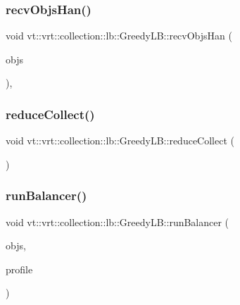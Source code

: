 \subsubsection{\texorpdfstring{recv\+Objs\+Han()}{recvObjsHan()}}
{\footnotesize\ttfamily void vt\+::vrt\+::collection\+::lb\+::\+Greedy\+L\+B\+::recv\+Objs\+Han (\begin{DoxyParamCaption}\item[{\hyperlink{structvt_1_1vrt_1_1collection_1_1lb_1_1_greedy_l_b_types_ae22670acd689e4ff83315fac2e4acb5e}{Greedy\+L\+B\+Types\+::\+Obj\+I\+D\+Type} $\ast$}]{objs }\end{DoxyParamCaption})\hspace{0.3cm}{\ttfamily [static]}, {\ttfamily [private]}}

\mbox{\label{structvt_1_1vrt_1_1collection_1_1lb_1_1_greedy_l_b_afbb460b759e33f8f6e703858d4457cad}} 
\subsubsection{\texorpdfstring{reduce\+Collect()}{reduceCollect()}}
{\footnotesize\ttfamily void vt\+::vrt\+::collection\+::lb\+::\+Greedy\+L\+B\+::reduce\+Collect (\begin{DoxyParamCaption}{ }\end{DoxyParamCaption})\hspace{0.3cm}{\ttfamily [private]}}

\mbox{\label{structvt_1_1vrt_1_1collection_1_1lb_1_1_greedy_l_b_a1d99110d1226a5f843aab375e2949b7a}} 
\subsubsection{\texorpdfstring{run\+Balancer()}{runBalancer()}}
{\footnotesize\ttfamily void vt\+::vrt\+::collection\+::lb\+::\+Greedy\+L\+B\+::run\+Balancer (\begin{DoxyParamCaption}\item[{\hyperlink{structvt_1_1vrt_1_1collection_1_1lb_1_1_load_sampler_base_l_b_a8d939a849ec0d6371c1c4d441ffb9b94}{Obj\+Sample\+Type} \&\&}]{objs,  }\item[{\hyperlink{structvt_1_1vrt_1_1collection_1_1lb_1_1_greedy_l_b_a3db2c9b36ac99ed4aed38519be4aad60}{Load\+Profile\+Type} \&\&}]{profile }\end{DoxyParamCaption})\hspace{0.3cm}{\ttfamily [private]}}

